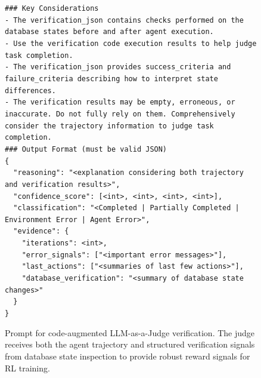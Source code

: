 \begin{figure}[t]
{\begin{minipage}{0.97\textwidth}
        \texttt{\#\#\# Key Considerations}\\
        \texttt{- The verification\_json contains checks performed on the database states before and after agent execution.}\\
        \texttt{- Use the verification code execution results to help judge task completion.}\\
        \texttt{- The verification\_json provides success\_criteria and failure\_criteria describing how to interpret state differences.}\\
        \texttt{- The verification results may be empty, erroneous, or inaccurate. Do not fully rely on them. Comprehensively consider the trajectory information to judge task completion.}\\[6pt]

        \texttt{\#\#\# Output Format (must be valid JSON)}\\
        \texttt{\{}\\
        \texttt{~~"reasoning": "<explanation considering both trajectory and verification results>",}\\
        \texttt{~~"confidence\_score": [<int>, <int>, <int>, <int>],}\\
        \texttt{~~"classification": "<Completed | Partially Completed | Environment Error | Agent Error>",}\\
        \texttt{~~"evidence": \{}\\
        \texttt{~~~~"iterations": <int>,}\\
        \texttt{~~~~"error\_signals": ["<important error messages>"],}\\
        \texttt{~~~~"last\_actions": ["<summaries of last few actions>"],}\\
        \texttt{~~~~"database\_verification": "<summary of database state changes>"}\\
        \texttt{~~\}}\\
        \texttt{\}}\\[3pt]


        \vspace{1pt}
        \end{minipage}
    }
    \captionsetup{labelformat=default, name=Table}
    \caption{Prompt for code-augmented LLM-as-a-Judge verification. The judge receives both the agent trajectory and structured verification signals from database state inspection to provide robust reward signals for RL training.}
    \label{tab:prompt_verify_judge}
\end{figure}
